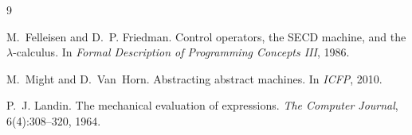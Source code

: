 \documentclass[11pt]{article}
\begin{document}
\begin{thebibliography}{9}

M.~Felleisen and D.~P. Friedman.
\newblock Control operators, the SECD machine, and the $\lambda$-calculus.
\newblock In \emph{Formal Description of Programming Concepts III}, 1986.

M.~Might and D.~Van~Horn.
\newblock Abstracting abstract machines.
\newblock In \emph{ICFP}, 2010.

P.~J. Landin.
\newblock The mechanical evaluation of expressions.
\newblock \emph{The Computer Journal}, 6(4):308--320, 1964.

\end{thebibliography}
\end{document}
